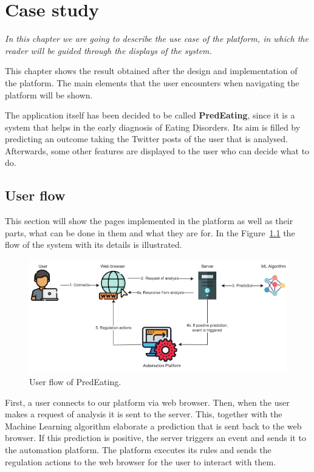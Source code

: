 \chapter{Case study}

\label{chap:case-study}

\textit{In this chapter we are going to describe the use case of the platform, in which the reader will be guided through the displays of the system.}

\clearpage

This chapter shows the result obtained after the design and implementation of the platform. The main elements that the user encounters when navigating the platform will be shown. 

The application itself has been decided to be called \textbf{PredEating}, since it is a system that helps in the early diagnosis of Eating Disorders. Its aim is filled by predicting an outcome taking the Twitter posts of the user that is analysed. Afterwards, some other features are displayed to the user who can decide what to do.

\section{User flow}

This section will show the pages implemented in the platform as well as their parts, what can be done in them and what they are for. In the Figure~\ref{fig:userflow} the flow of the system with its details is illustrated.

\begin{figure}[!htp]
    \centering
    \includegraphics[scale=0.3]{img/case/Userflow.png}
    \caption{User flow of PredEating.}
    \label{fig:userflow}
\end{figure}

First, a user connects to our platform via web browser. Then, when the user makes a request of analysis it is sent to the server. This, together with the Machine Learning algorithm elaborate a prediction that is sent back to the web browser. If this prediction is positive, the server triggers an event and sends it to the automation platform. The platform executes its rules and sends the regulation actions to the web browser for the user to interact with them.

